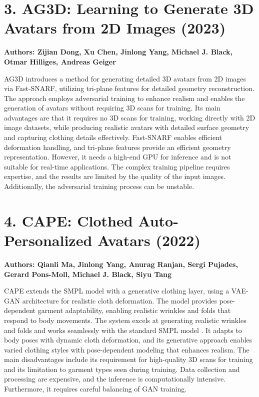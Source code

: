 \documentclass[12pt,a4paper,oneside]{report}
\begin{document}
\section*{3. AG3D: Learning to Generate 3D Avatars from 2D Images (2023)}

\textbf{Authors: Zijian Dong, Xu Chen, Jinlong Yang, Michael J. Black, Otmar Hilliges, Andreas Geiger}

AG3D \cite{3} introduces a method for generating detailed 3D avatars from 2D images via Fast-SNARF, utilizing tri-plane features for detailed geometry reconstruction. The approach employs adversarial training to enhance realism and enables the generation of avatars without requiring 3D scans for training. Its main advantages are that it requires no 3D scans for training, working directly with 2D image datasets, while producing realistic avatars with detailed surface geometry and capturing clothing details effectively. Fast-SNARF enables efficient deformation handling, and tri-plane features provide an efficient geometry representation. However, it needs a high-end GPU for inference and is not suitable for real-time applications. The complex training pipeline requires expertise, and the results are limited by the quality of the input images. Additionally, the adversarial training process can be unstable.

\section*{4. CAPE: Clothed Auto-Personalized Avatars (2022)}

\textbf{Authors: Qianli Ma, Jinlong Yang, Anurag Ranjan, Sergi Pujades, Gerard Pons-Moll, Michael J. Black, Siyu Tang}

CAPE \cite{4} extends the SMPL model with a generative clothing layer, using a VAE-GAN architecture for realistic cloth deformation. The model provides pose-dependent garment adaptability, enabling realistic wrinkles and folds that respond to body movements. The system excels at generating realistic wrinkles and folds and works seamlessly with the standard SMPL model \cite{2}. It adapts to body poses with dynamic cloth deformation, and its generative approach enables varied clothing styles with pose-dependent modeling that enhances realism. The main disadvantages include its requirement for high-quality 3D scans for training and its limitation to garment types seen during training. Data collection and processing are expensive, and the inference is computationally intensive. Furthermore, it requires careful balancing of GAN training.
\end{document}
